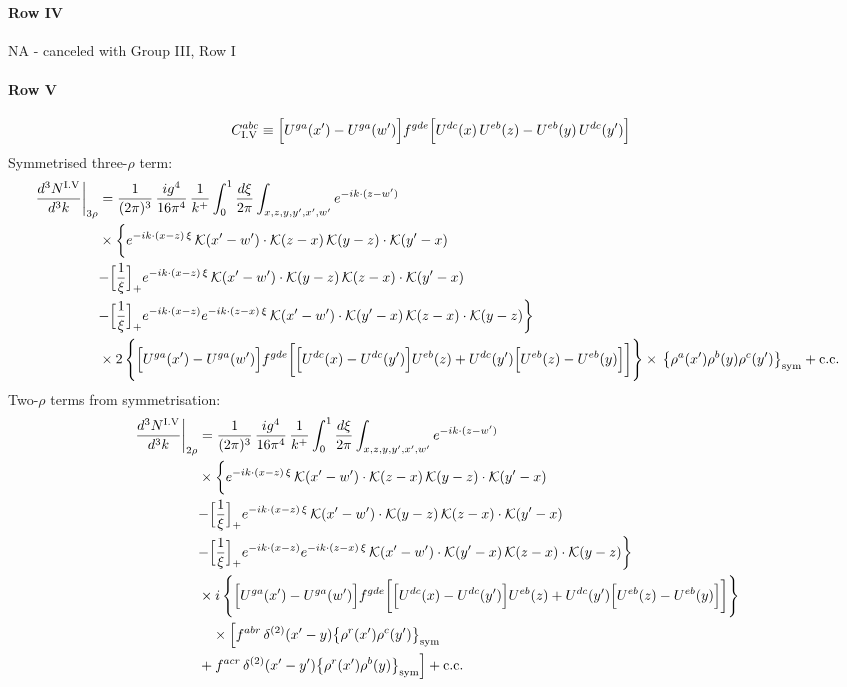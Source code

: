 \documentclass[9pt]{article}
\numberwithin{equation}{section}
\begin{document}
\paragraph*{Row IV}
\textsc{NA} - canceled with Group III, Row I
\paragraph*{Row V}
\begin{align}
C^{abc}_{{\rm I.V}}&\equiv \Big[U^{ga}(x')-U^{ga}(w')\Big]f^{gde}\Big[U^{dc}(x)\,U^{eb}(z)-U^{eb}(y)\,U^{dc}(y')\Big]\notag
\end{align}
Symmetrised three-$\rho$ term:
\begin{align}
\frac{d^{3}N^{\rm I.V}}{d^{3}k}\bigg|_{3\rho}&=\frac{1}{(2\pi)^{3}}\,\frac{ig^{4}}{16\pi^{4}}\,\frac{1}{k^{+}}\int_{0}^{1}\frac{d\xi}{2\pi}\int_{x,z,y,y',x',w'}e^{-ik\cdot(z-w')}\notag\\
&\times\bigg\{e^{-ik\cdot(x-z)\,\xi}\,\mathcal{K}(x'-w')\cdot\mathcal{K}(z-x)\,\mathcal{K}(y-z)\cdot\mathcal{K}(y'-x)\notag\\
&{-\Big[\frac{1}{\xi}\Big]_{+}e^{-ik\cdot(x-z)\,\xi}\,\mathcal{K}(x'-w')\cdot\mathcal{K}(y-z)\,\mathcal{K}(z-x)\cdot\mathcal{K}(y'-x)}\notag\\
&{-\Big[\frac{1}{\xi}\Big]_{+}e^{-ik\cdot(x-z)}e^{-ik\cdot(z-x)\,\xi}\,\mathcal{K}(x'-w')\cdot\mathcal{K}(y'-x)\,\mathcal{K}(z-x)\cdot\mathcal{K}(y-z)}\bigg\}\notag\\
&\times 2\,\Bigg\{\Big[U^{ga}(x')-U^{ga}(w')\Big]f^{gde}\bigg[\Big[U^{dc}(x)-U^{dc}(y')\Big]U^{eb}(z)+U^{dc}(y')\Big[U^{eb}(z)-U^{eb}(y)\Big]\bigg]\Bigg\}\times\,\big\{\rho^{a}(x')\rho^{b}(y)\rho^{c}(y')\big\}_{\rm sym}+{\rm c.c.}\label{eq:H-I.V-3}
\end{align}
Two-$\rho$ terms from symmetrisation:
\begin{align}
\frac{d^{3}N^{\rm I.V}}{d^{3}k}\bigg|_{2\rho}&=\frac{1}{(2\pi)^{3}}\,\frac{ig^{4}}{16\pi^{4}}\,\frac{1}{k^{+}}\int_{0}^{1}\frac{d\xi}{2\pi}\int_{x,z,y,y',x',w'}e^{-ik\cdot(z-w')}\notag\\
&\times\bigg\{e^{-ik\cdot(x-z)\,\xi}\,\mathcal{K}(x'-w')\cdot\mathcal{K}(z-x)\,\mathcal{K}(y-z)\cdot\mathcal{K}(y'-x)\notag\\
&{-\Big[\frac{1}{\xi}\Big]_{+}e^{-ik\cdot(x-z)\,\xi}\,\mathcal{K}(x'-w')\cdot\mathcal{K}(y-z)\,\mathcal{K}(z-x)\cdot\mathcal{K}(y'-x)}\notag\\
&{-\Big[\frac{1}{\xi}\Big]_{+}e^{-ik\cdot(x-z)}e^{-ik\cdot(z-x)\,\xi}\,\mathcal{K}(x'-w')\cdot\mathcal{K}(y'-x)\,\mathcal{K}(z-x)\cdot\mathcal{K}(y-z)}\bigg\}\notag\\
&\times i\,\Bigg\{\Big[U^{ga}(x')-U^{ga}(w')\Big]f^{gde}\bigg[\Big[U^{dc}(x)-U^{dc}(y')\Big]U^{eb}(z)+U^{dc}(y')\Big[U^{eb}(z)-U^{eb}(y)\Big]\bigg]\Bigg\}\notag\\&\quad\times\Big[f^{abr}\,\delta^{(2)}(x'-y)\big\{\rho^{r}(x')\rho^{c}(y')\big\}_{\rm sym}\notag\\
& +f^{acr}\,\delta^{(2)}(x'-y')\big\{\rho^{r}(x')\rho^{b}(y)\big\}_{\rm sym}\Big]+{\rm c.c.}\label{eq:H-I.V-2}
\end{align}
\end{document}
